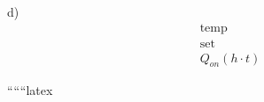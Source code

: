 d)
\begin{align*}
    \text{temp} \\
    \text{set} \\
    Q_{on} \left( h \cdot t \right)
\end{align*}

``````latex